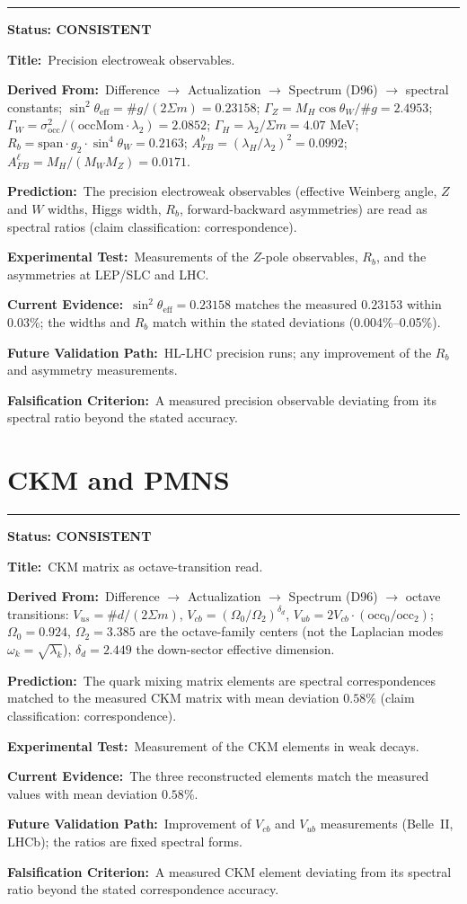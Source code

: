\documentclass[11pt,a4paper]{article}
\newcommand{\predstart}[2]{%
  \par\medskip\noindent\hrule\par\smallskip
  \noindent{\large\bfseries #1}\hfill{\bfseries Status: #2}\par\smallskip
}
\newcommand{\pfield}[2]{%
  \noindent\textbf{#1:}~#2\par\smallskip
}
\begin{document}
\predstart{AT-P004}{CONSISTENT}
\pfield{Title}{Precision electroweak observables.}
\pfield{Derived From}{Difference $\to$ Actualization $\to$ Spectrum (D96) $\to$ spectral
constants; $\sin^2\theta_{\mathrm{eff}} = \#g/(2\Sigma m) = 0.23158$;
$\Gamma_Z = M_H\cos\theta_W/\#g = 2.4953$; $\Gamma_W = \sigma_{\mathrm{occ}}^2/
(\mathrm{occMom}\cdot\lambda_2) = 2.0852$; $\Gamma_H = \lambda_2/\Sigma m = 4.07$ MeV;
$R_b = \mathrm{span}\cdot g_2\cdot\sin^4\theta_W = 0.2163$;
$A_{FB}^b = (\lambda_H/\lambda_2)^2 = 0.0992$; $A_{FB}^\ell = M_H/(M_W M_Z) = 0.0171$.}
\pfield{Prediction}{The precision electroweak observables (effective Weinberg angle, $Z$
and $W$ widths, Higgs width, $R_b$, forward-backward asymmetries) are read as spectral
ratios (claim classification: correspondence).}
\pfield{Experimental Test}{Measurements of the $Z$-pole observables, $R_b$, and the
asymmetries at LEP/SLC and LHC.}
\pfield{Current Evidence}{$\sin^2\theta_{\mathrm{eff}} = 0.23158$ matches the measured
$0.23153$ within $0.03\%$; the widths and $R_b$ match within the stated deviations
(0.004\%--0.05\%).}
\pfield{Future Validation Path}{HL-LHC precision runs; any improvement of the $R_b$ and
asymmetry measurements.}
\pfield{Falsification Criterion}{A measured precision observable deviating from its spectral
ratio beyond the stated accuracy.}

\section{CKM and PMNS}
\label{sec:mixing}

\predstart{AT-P005}{CONSISTENT}
\pfield{Title}{CKM matrix as octave-transition read.}
\pfield{Derived From}{Difference $\to$ Actualization $\to$ Spectrum (D96) $\to$ octave
transitions: $V_{us} = \#d/(2\Sigma m)$,
$V_{cb} = (\Omega_0/\Omega_2)^{\delta_d}$, $V_{ub} = 2V_{cb}\cdot(\mathrm{occ}_0/
\mathrm{occ}_2)$; $\Omega_0 = 0.924$, $\Omega_2 = 3.385$ are the octave-family centers
(not the Laplacian modes $\omega_k = \sqrt{\lambda_k}$), $\delta_d = 2.449$ the down-sector
effective dimension.}
\pfield{Prediction}{The quark mixing matrix elements are spectral correspondences matched to
the measured CKM matrix with mean deviation $0.58\%$ (claim classification:
correspondence).}
\pfield{Experimental Test}{Measurement of the CKM elements in weak decays.}
\pfield{Current Evidence}{The three reconstructed elements match the measured values with
mean deviation $0.58\%$.}
\pfield{Future Validation Path}{Improvement of $V_{cb}$ and $V_{ub}$ measurements (Belle~II,
LHCb); the ratios are fixed spectral forms.}
\pfield{Falsification Criterion}{A measured CKM element deviating from its spectral ratio
beyond the stated correspondence accuracy.}
\end{document}
